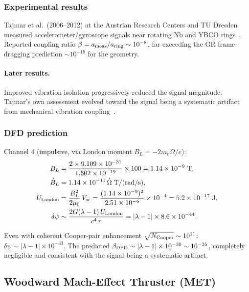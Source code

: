 \documentclass[aps,prd,twocolumn,superscriptaddress,floatfix,nofootinbib]{revtex4-2}
\newcommand{\lam}{\lambda}
\begin{document}
\subsubsection{Experimental results}

Tajmar et al.\ (2006--2012) at the Austrian Research Centers and TU
Dresden measured accelerometer/gyroscope signals near rotating Nb and
YBCO rings~\cite{Tajmar2006,Tajmar2009}. Reported coupling ratio
$\beta = a_{\rm meas}/a_{\rm ring} \sim 10^{-8}$, far exceeding the
GR frame-dragging prediction $\sim 10^{-19}$ for the geometry.

\paragraph{Later results.}
Improved vibration isolation progressively reduced the signal magnitude.
Tajmar's own assessment evolved toward the signal being a systematic
artifact from mechanical vibration coupling~\cite{Tajmar2012}.

\subsubsection{DFD prediction}

Channel 4 (impulsive, via London moment $B_L = -2m_e\Omega/e$):
\begin{align}
B_L &= \frac{2 \times 9.109\times10^{-31}}{1.602\times10^{-19}}
\times 100 = 1.14\times10^{-9}\;\si{T}, \\
\dot{B}_L &= 1.14\times10^{-11}\,\dot\Omega\;\si{T/(rad/s)}, \\
U_{\rm London} &= \frac{B_L^2}{2\mu_0}\,V_{\rm sc}
= \frac{(1.14\times10^{-9})^2}{2.51\times10^{-6}} \times 10^{-4}
= 5.2\times10^{-17}\;\si{J}, \\
\delta\psi &\sim \frac{2G(\lam-1)\,U_{\rm London}}{c^4\,r}
= |\lam-1| \times 8.6\times10^{-44}.
\end{align}

Even with coherent Cooper-pair enhancement $\sqrt{N_{\rm Cooper}}
\sim 10^{11}$: $\delta\psi \sim |\lam-1| \times 10^{-33}$.
The predicted $\beta_{\rm DFD} \sim |\lam-1| \times 10^{-30}
\sim 10^{-35}$, completely negligible and consistent with the signal
being a systematic artifact.

\subsection{Woodward Mach-Effect Thruster (MET)}\label{sec:woodward}
\end{document}
